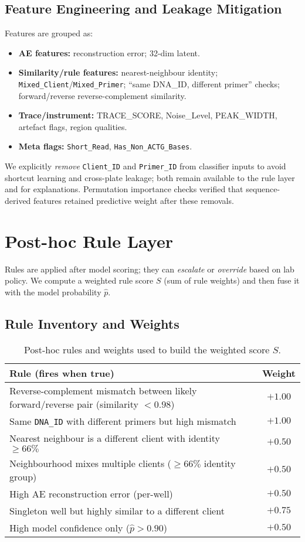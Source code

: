 \subsection{Feature Engineering and Leakage Mitigation}
Features are grouped as:
\begin{itemize}
  \item \textbf{AE features:} reconstruction error; 32-dim latent.
  \item \textbf{Similarity/rule features:} nearest-neighbour identity; \texttt{Mixed\_Client}/\texttt{Mixed\_Primer}; ``same DNA\_ID, different primer'' checks; forward/reverse reverse-complement similarity.
  \item \textbf{Trace/instrument:} TRACE\_SCORE, Noise\_Level, PEAK\_WIDTH, artefact flags, region qualities.
  \item \textbf{Meta flags:} \texttt{Short\_Read}, \texttt{Has\_Non\_ACTG\_Bases}.
\end{itemize}
We explicitly \emph{remove} \texttt{Client\_ID} and \texttt{Primer\_ID} from classifier inputs to avoid shortcut learning and cross-plate leakage; both remain available to the rule layer and for explanations. Permutation importance checks verified that sequence-derived features retained predictive weight after these removals.

\section{Post-hoc Rule Layer}
\label{sec:rules}
Rules are applied after model scoring; they can \emph{escalate} or \emph{override} based on lab policy. We compute a weighted rule score $S$ (sum of rule weights) and then fuse it with the model probability $\hat p$.

\subsection{Rule Inventory and Weights}
\begin{table}[H]\centering
\caption{Post-hoc rules and weights used to build the weighted score $S$.}
\label{tab:rules}
\begin{tabular}{|p{9.0cm}|c|}
\hline
\textbf{Rule (fires when true)} & \textbf{Weight} \\ \hline
Reverse-complement mismatch between likely forward/reverse pair (similarity $<\!0.98$) & $+1.00$ \\ \hline
Same \texttt{DNA\_ID} with different primers but high mismatch & $+1.00$ \\ \hline
Nearest neighbour is a different client with identity $\geq 66\%$ & $+0.50$ \\ \hline
Neighbourhood mixes multiple clients ($\geq 66\%$ identity group) & $+0.50$ \\ \hline
High AE reconstruction error (per-well) & $+0.50$ \\ \hline
Singleton well but highly similar to a different client & $+0.75$ \\ \hline
High model confidence only ($\hat p > 0.90$) & $+0.50$ \\ \hline
\end{tabular}
\end{table}

